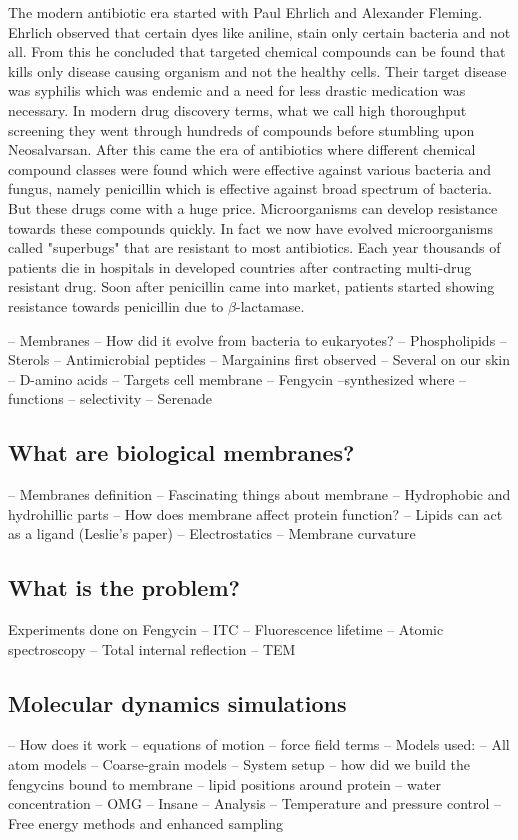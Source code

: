 The modern antibiotic era started with Paul Ehrlich and Alexander Fleming. 
Ehrlich observed that certain dyes like aniline, stain only certain bacteria and not all. 
From this he concluded that targeted chemical compounds can be found that 
kills only disease causing organism and not the healthy cells. 
Their target disease was syphilis which was endemic and a need for less drastic medication
was necessary. In modern drug discovery terms, what we call high thoroughput screening 
they went through hundreds of compounds before stumbling upon 
Neosalvarsan.\cite{Hata1910}
After this came the era of antibiotics where different chemical compound classes were 
found which were effective against various bacteria and fungus, namely penicillin which is effective against broad spectrum of bacteria.\cite{Fleming1929}
But these drugs come with a huge price. Microorganisms can develop resistance towards 
these compounds quickly. In fact we now have evolved microorganisms called "superbugs" that 
are resistant to most antibiotics. Each year thousands of patients die in 
hospitals in developed countries after contracting multi-drug resistant 
drug.\cite{@roderick2007}
Soon after penicillin came into market, patients started showing resistance towards 
penicillin due to $\beta$-lactamase.



    -- Membranes 
        -- How did it evolve from bacteria to eukaryotes? 
        -- Phospholipids 
        -- Sterols 
    -- Antimicrobial peptides 
        -- Margainins first observed 
        -- Several on our skin 
        -- D-amino acids 
        -- Targets cell membrane 
    -- Fengycin
        --synthesized where 
        -- functions 
        -- selectivity 
        -- Serenade 

\subsection{What are biological membranes?}
\label{s:membrane_intro}
-- Membranes definition 
-- Fascinating things about membrane 
-- Hydrophobic and hydrohillic parts 
-- How does membrane affect protein function? 
    -- Lipids can act as a ligand (Leslie's paper) 
    -- Electrostatics 
    -- Membrane curvature 

\subsection{What is the problem?}
Experiments done on Fengycin 
-- ITC 
-- Fluorescence lifetime 
-- Atomic spectroscopy 
-- Total internal reflection 
-- TEM 


\subsection{Molecular dynamics simulations}
-- How does it work 
    -- equations of motion
    -- force field terms 
-- Models used: 
    -- All atom models 
    -- Coarse-grain models 
-- System setup 
    -- how did we build the fengycins bound to membrane 
    -- lipid positions around protein 
    -- water concentration 
    -- OMG 
    -- Insane 
-- Analysis 
-- Temperature and pressure control 
-- Free energy methods and enhanced sampling 
